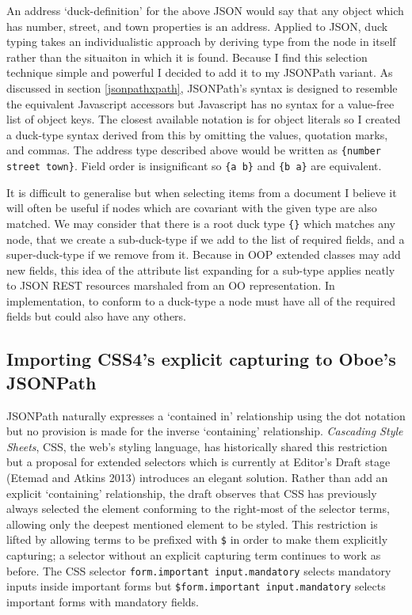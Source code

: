 \documentclass[12pt, ]{article}
\begin{document}
An address `duck-definition' for the above JSON would say that any
object which has number, street, and town properties is an address.
Applied to JSON, duck typing takes an individualistic approach by
deriving type from the node in itself rather than the situaiton in which
it is found. Because I find this selection technique simple and powerful
I decided to add it to my JSONPath variant. As discussed in section
\ref{jsonpathxpath}, JSONPath's syntax is designed to resemble the
equivalent Javascript accessors but Javascript has no syntax for a
value-free list of object keys. The closest available notation is for
object literals so I created a duck-type syntax derived from this by
omitting the values, quotation marks, and commas. The address type
described above would be written as \texttt{\{number street town\}}.
Field order is insignificant so \texttt{\{a b\}} and \texttt{\{b a\}}
are equivalent.

It is difficult to generalise but when selecting items from a document I
believe it will often be useful if nodes which are covariant with the
given type are also matched. We may consider that there is a root duck
type \texttt{\{\}} which matches any node, that we create a
sub-duck-type if we add to the list of required fields, and a
super-duck-type if we remove from it. Because in OOP extended classes
may add new fields, this idea of the attribute list expanding for a
sub-type applies neatly to JSON REST resources marshaled from an OO
representation. In implementation, to conform to a duck-type a node must
have all of the required fields but could also have any others.

\subsection{Importing CSS4's explicit capturing to Oboe's
JSONPath}\label{importing-css4s-explicit-capturing-to-oboes-jsonpath}

JSONPath naturally expresses a `contained in' relationship using the dot
notation but no provision is made for the inverse `containing'
relationship. \emph{Cascading Style Sheets}, CSS, the web's styling
language, has historically shared this restriction but a proposal for
extended selectors which is currently at Editor's Draft stage (Etemad
and Atkins 2013) introduces an elegant solution. Rather than add an
explicit `containing' relationship, the draft observes that CSS has
previously always selected the element conforming to the right-most of
the selector terms, allowing only the deepest mentioned element to be
styled. This restriction is lifted by allowing terms to be prefixed with
\texttt{\$} in order to make them explicitly capturing; a selector
without an explicit capturing term continues to work as before. The CSS
selector \texttt{form.important input.mandatory} selects mandatory
inputs inside important forms but
\texttt{\$form.important input.mandatory} selects important forms with
mandatory fields.
\end{document}
